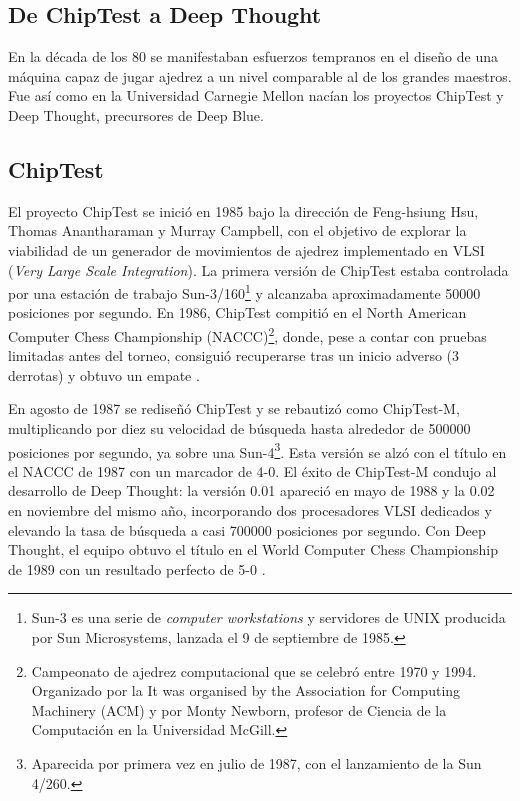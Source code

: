 \documentclass[a4paper, 12pt]{article}
\begin{document}
\subsection{De ChipTest a Deep Thought}

En la década de los 80 se manifestaban esfuerzos tempranos en 
el diseño de una máquina capaz de jugar ajedrez a un nivel comparable
al de los grandes maestros. Fue así como en la Universidad 
Carnegie Mellon nacían los proyectos ChipTest y Deep Thought,
precursores de Deep Blue.


\subsection{ChipTest}
El proyecto ChipTest se inició en 1985 bajo la dirección de 
Feng-hsiung Hsu, Thomas 
Anantharaman y Murray Campbell, con el objetivo de explorar la 
viabilidad de un generador de movimientos de ajedrez 
implementado en VLSI (\emph{Very Large Scale Integration}). La primera versión de 
ChipTest estaba controlada por una estación de trabajo 
Sun-3/160\footnote{Sun-3 es una serie de \emph{computer workstations} y servidores de UNIX producida por Sun Microsystems, lanzada el 9 de septiembre de 1985.} 
y alcanzaba aproximadamente 50000 posiciones por 
segundo. En 1986, ChipTest compitió en el North 
American Computer Chess Championship (NACCC)\footnote{Campeonato 
de ajedrez computacional que se celebró entre 1970 y 1994. 
Organizado por la It was organised by the Association for 
Computing Machinery (ACM) y por Monty Newborn, profesor de 
Ciencia de la Computación en la Universidad McGill.}, 
donde, pese a contar con 
pruebas limitadas antes del torneo, consiguió recuperarse tras 
un inicio adverso (3 derrotas) y obtuvo un empate 
\cite{hsu1990deep}.

En agosto de 1987 se rediseñó ChipTest y se rebautizó como 
ChipTest-M, multiplicando por diez su velocidad de búsqueda 
hasta alrededor de 500000 posiciones por segundo, ya sobre una 
Sun-4\footnote{Aparecida por primera vez en julio de 1987, con el lanzamiento de la Sun 4/260.}. 
Esta versión se alzó con el título en el 
NACCC de 1987 con un marcador de 4-0. El éxito de 
ChipTest-M condujo al desarrollo de Deep Thought: la versión 
0.01 apareció en mayo de 1988 y la 0.02 en noviembre del mismo 
año, incorporando dos procesadores VLSI dedicados y elevando la 
tasa de búsqueda a casi 700000 posiciones por segundo. Con Deep Thought, el equipo obtuvo el título en 
el World Computer Chess Championship de 1989 con un resultado 
perfecto de 5-0 \cite{newborn1988results}.
\end{document}
